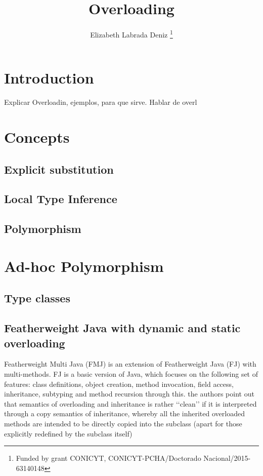 \documentclass{article}
\title{\bf Overloading}
\author{Elizabeth Labrada Deniz
\thanks{Funded by grant CONICYT, CONICYT-PCHA/Doctorado Nacional/2015-63140148}}
\affil{Computer Science Department (DCC), University of Chile, Chile}
\date{}
\begin{document}
	\maketitle
	\renewcommand{\abstractname}{Abstract}	
	\begin{abstract}
	\end{abstract}	
\section{Introduction}
Explicar Overloadin, ejemplos, para que sirve. Hablar de overl
\section{Concepts}\label{section:concepts}
\subsection{Explicit substitution}
\subsection{Local Type Inference}
\subsection{Polymorphism}
\section{Ad-hoc Polymorphism}\label{section:polymorphism}
\subsection{Type classes}
\subsection{Featherweight Java with dynamic and static overloading}
Featherweight Multi Java (FMJ) is an extension of Featherweight Java (FJ) with multi-methods. FJ is a basic version of Java, which focuses on the following set of features: class definitions, object creation, method invocation, field access, inheritance, subtyping and method recursion through this.
the authors point out that semantics of overloading and inheritance is rather ‘‘clean’’ if it is interpreted through a copy semantics of inheritance, whereby all the inherited overloaded methods are intended to be directly copied into the subclass (apart for those explicitly redefined by the subclass itself) 
\end{document}
